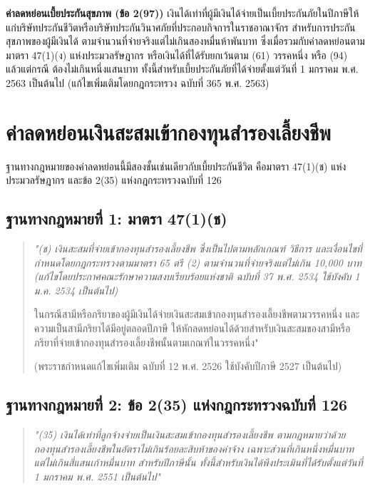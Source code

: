 \documentclass[12pt,a4paper]{article}
\begin{document}
\textbf{ค่าลดหย่อนเบี้ยประกันสุขภาพ (ข้อ 2(97))} เงินได้เท่าที่ผู้มีเงินได้จ่ายเป็นเบี้ยประกันภัยในปีภาษีให้แก่บริษัทประกันชีวิตหรือบริษัทประกันวินาศภัยที่ประกอบกิจการในราชอาณาจักร สำหรับการประกันสุขภาพของผู้มีเงินได้ ตามจำนวนที่จ่ายจริงแต่ไม่เกินสองหมื่นห้าพันบาท ซึ่งเมื่อรวมกับค่าลดหย่อนตามมาตรา 47(1)(ง) แห่งประมวลรัษฎากร หรือเงินได้ที่ได้รับยกเว้นตาม (61) วรรคหนึ่ง หรือ (94) แล้วแต่กรณี ต้องไม่เกินหนึ่งแสนบาท ทั้งนี้สำหรับเบี้ยประกันภัยที่ได้จ่ายตั้งแต่วันที่ 1 มกราคม พ.ศ. 2563 เป็นต้นไป (แก้ไขเพิ่มเติมโดยกฎกระทรวง ฉบับที่ 365 พ.ศ. 2563)


\newpage
\section{ค่าลดหย่อนเงินสะสมเข้ากองทุนสำรองเลี้ยงชีพ}

ฐานทางกฎหมายของค่าลดหย่อนนี้มีสองชั้นเช่นเดียวกับเบี้ยประกันชีวิต คือมาตรา 47(1)(ช) แห่งประมวลรัษฎากร และข้อ 2(35) แห่งกฎกระทรวงฉบับที่ 126

\subsection*{ฐานทางกฎหมายที่ 1: มาตรา 47(1)(ช)}

\begin{quote}
{\itshape "(ช) เงินสะสมที่จ่ายเข้ากองทุนสำรองเลี้ยงชีพ ซึ่งเป็นไปตามหลักเกณฑ์ วิธีการ และเงื่อนไขที่กำหนดโดยกฎกระทรวงตามมาตรา 65 ตรี (2) ตามจำนวนที่จ่ายจริงแต่ไม่เกิน 10,000 บาท (แก้ไขโดยประกาศคณะรักษาความสงบเรียบร้อยแห่งชาติ ฉบับที่ 37 พ.ศ. 2534 ใช้บังคับ 1 ม.ค. 2534 เป็นต้นไป)

ในกรณีสามีหรือภริยาของผู้มีเงินได้จ่ายเงินสะสมเข้ากองทุนสำรองเลี้ยงชีพตามวรรคหนึ่ง และความเป็นสามีภริยาได้มีอยู่ตลอดปีภาษี ให้หักลดหย่อนได้ด้วยสำหรับเงินสะสมของสามีหรือภริยาที่จ่ายเข้ากองทุนสำรองเลี้ยงชีพนั้นตามเกณฑ์ในวรรคหนึ่ง"} (พระราชกำหนดแก้ไขเพิ่มเติม ฉบับที่ 12 พ.ศ. 2526 ใช้บังคับปีภาษี 2527 เป็นต้นไป)
\end{quote}

\subsection*{ฐานทางกฎหมายที่ 2: ข้อ 2(35) แห่งกฎกระทรวงฉบับที่ 126}

\begin{quote}
\textit{"(35) เงินได้เท่าที่ลูกจ้างจ่ายเป็นเงินสะสมเข้ากองทุนสำรองเลี้ยงชีพ ตามกฎหมายว่าด้วยกองทุนสำรองเลี้ยงชีพในอัตราไม่เกินร้อยละสิบห้าของค่าจ้าง เฉพาะส่วนที่เกินหนึ่งหมื่นบาท แต่ไม่เกินสี่แสนเก้าหมื่นบาท สำหรับปีภาษีนั้น ทั้งนี้สำหรับเงินได้พึงประเมินที่ได้รับตั้งแต่วันที่ 1 มกราคม พ.ศ. 2551 เป็นต้นไป"}
\end{quote}
\end{document}
